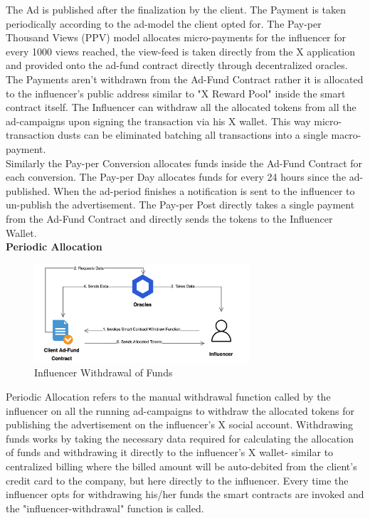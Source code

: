 \documentclass[letterpaper,11pt]{article}
\begin{document}
The Ad is published after the finalization by the client. The Payment is taken periodically according to the ad-model the client opted for. The Pay-per Thousand Views (PPV) model allocates micro-payments for the influencer for every 1000 views reached, the view-feed is taken directly from the X application and provided onto the ad-fund contract directly through decentralized oracles. The Payments aren't withdrawn from the Ad-Fund Contract rather it is allocated to the influencer's public address similar to "X Reward Pool" inside the smart contract itself. The Influencer can withdraw all the allocated tokens from all the ad-campaigns upon signing the transaction via his X wallet. This way micro-transaction dusts can be eliminated batching all transactions into a single macro-payment. \\

Similarly the Pay-per Conversion allocates funds inside the Ad-Fund Contract for each conversion. The Pay-per Day allocates funds for every 24 hours since the ad-published. When the ad-period finishes a notification is sent to the influencer to un-publish the advertisement. The Pay-per Post directly takes a single payment from the Ad-Fund Contract and directly sends the tokens to the Influencer Wallet.\\

\textbf{Periodic Allocation}\\

\begin{figure}[H]
\begin{center}
\includegraphics[width=8cm]{periodic-allocation}
\caption{Influencer Withdrawal of Funds}
\end{center}
\end{figure}

Periodic Allocation refers to the manual withdrawal function called by the influencer on all the running ad-campaigns to withdraw the allocated tokens for publishing the advertisement on the influencer's X social account. Withdrawing funds works by taking the necessary data required for  calculating the allocation of funds and withdrawing it directly to the influencer's X wallet- similar to centralized billing where the billed amount will be auto-debited from the client's credit card to the company, but here directly to the influencer. Every time the influencer opts for withdrawing his/her funds the smart contracts are invoked and the "influencer-withdrawal" function is called.\\
\end{document}

